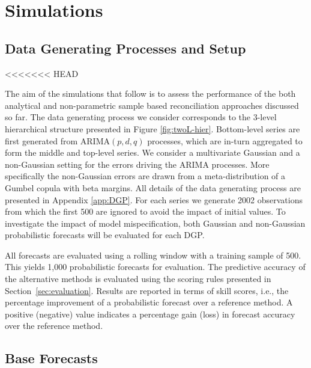 \documentclass[12pt]{article}
\theoremstyle{definition}
\begin{document}
\section{Simulations}\label{sec:simulations}

\subsection{Data Generating Processes and Setup}
<<<<<<< HEAD

The aim of the simulations that follow is to assess the performance of the  both analytical and non-parametric sample based reconciliation approaches discussed so far. The data generating process we consider corresponds to the 3-level hierarchical structure presented in Figure \ref{fig:twoL-hier}. Bottom-level series are first generated from ARIMA$(p,d,q)$ processes, which are in-turn aggregated to form the middle and top-level series. We consider a multivariate Gaussian and a non-Gaussian setting for the errors driving the ARIMA processes. More specifically the non-Gaussian errors are drawn from a meta-distribution of a Gumbel copula with beta margins. All details of the data generating process are presented in Appendix \ref{app:DGP}.  For each series we generate 2002 observations from which the first 500 are ignored to avoid the impact of initial values. To investigate the impact of model mispecification, both Gaussian and non-Gaussian probabilistic forecasts will be evaluated for each DGP.

All forecasts are evaluated using a rolling window with a training sample of 500. This yields 1,000 probabilistic forecasts for evaluation. The predictive accuracy of the alternative methods is evaluated using the scoring rules presented in Section~\ref{sec:evaluation}. Results are reported in terms of skill scores, i.e., the percentage improvement of a probabilistic forecast over a reference method. A positive (negative) value indicates a percentage gain (loss) in forecast accuracy over the reference method.

\subsection{Base Forecasts}
\end{document}
